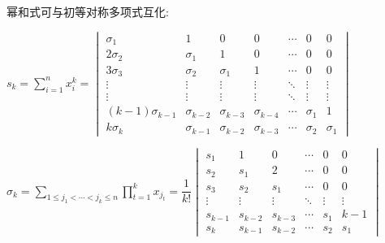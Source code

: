 幂和式可与初等对称多项式互化:

$ s_k=\sum_{i=1}^{n}{x_i^k}=\begin{vmatrix}
\sigma_1  & 1        & 0		& 0 &\cdots  & 0 & 0 \\
2\sigma_2 & \sigma_1 & 1		& 0 & \cdots & 0 & 0\\
3\sigma_3 & \sigma_2 & \sigma_1 & 1 & \cdots & 0 & 0\\
\vdots	  & \vdots   & \vdots   &\vdots & \ddots & \vdots & \vdots \\
\vdots	  & \vdots   & \vdots   &\vdots & \ddots & \vdots & \vdots \\
(k-1)\sigma_{k-1} &\sigma_{k-2} &\sigma_{k-3} & \sigma_{k-4}& \cdots&\sigma_1&1\\
k\sigma_k & \sigma_{k-1} &\sigma_{k-2} &\sigma_{k-3} &\cdots &\sigma_2 &\sigma_1 
\end{vmatrix}$

$ \sigma_k=\sum_{1\le j_1<\cdots <j_k\le n}{\prod_{t=1}^k{x_{j_t}}} = \dfrac{1}{k!}\begin{vmatrix} 
s_1		& 1		& 0		& \cdots & 0 & 0\\
s_2 	& s_1	& 2 	& \cdots & 0 & 0\\
s_3 	& s_2 	& s_1	& \cdots & 0 & 0\\
\vdots  & \vdots& \vdots& \ddots & \vdots & \vdots\\
s_{k-1} &s_{k-2}&s_{k-3}& \cdots &s_1 &k-1\\
s_{k}	&s_{k-1}&s_{k-2}& \cdots &s_2 &s_1
\end{vmatrix}$
